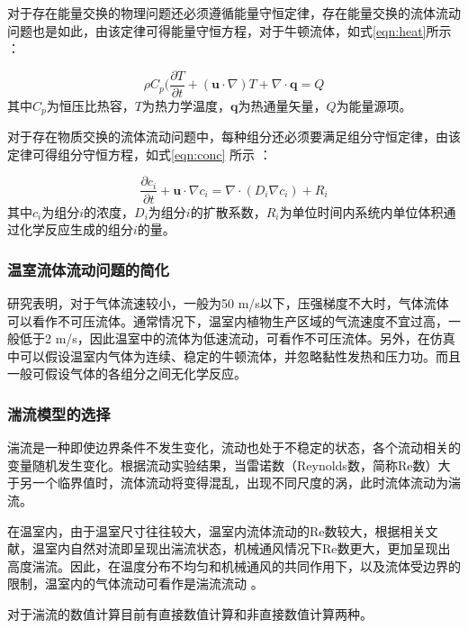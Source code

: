 对于存在能量交换的物理问题还必须遵循能量守恒定律，存在能量交换的流体流动问题也是如此，由该定律可得能量守恒方程，对于牛顿流体，如式\ref{eqn:heat}所示\supercite{ComsolHeat2015,WangFujun2004} ：

	\begin{equation}
		\label{eqn:heat}
		\rho C_p (\frac{\partial T}{\partial t}+(\mathbf{u} \cdot \nabla) T + \nabla \cdot \mathbf{q}  =Q
	\end{equation}
其中$C_p$为恒压比热容，$T$为热力学温度，$\mathbf{q}$为热通量矢量，$Q$为能量源项。

对于存在物质交换的流体流动问题中，每种组分还必须要满足组分守恒定律，由该定律可得组分守恒方程，如式\ref{eqn:conc} 所示\supercite{ComsolChem2015,WangFujun2004} ：

	\begin{equation}
		\label{eqn:conc}
		\frac{\partial c_i}{\partial t}+\mathbf{u} \cdot \nabla c_i = \nabla \cdot (D_i \nabla c_i ) + R_i
	\end{equation}
其中$c_i$为组分$i$的浓度，$D_i$为组分$i$的扩散系数，$R_i$为单位时间内系统内单位体积通过化学反应生成的组分$i$的量。

		\subsubsection{温室流体流动问题的简化}
研究表明，对于气体流速较小，一般为50 m/s以下，压强梯度不大时，气体流体可以看作不可压流体。通常情况下，温室内植物生产区域的气流速度不宜过高，一般低于2 m/s，因此温室中的流体为低速流动，可看作不可压流体。另外，在仿真中可以假设温室内气体为连续、稳定的牛顿流体，并忽略黏性发热和压力功。而且一般可假设气体的各组分之间无化学反应。

		\subsubsection{湍流模型的选择}
湍流是一种即使边界条件不发生变化，流动也处于不稳定的状态，各个流动相关的变量随机发生变化。根据流动实验结果，当雷诺数（Reynolds数，简称Re数）大于另一个临界值时，流体流动将变得混乱，出现不同尺度的涡，此时流体流动为湍流。

在温室内，由于温室尺寸往往较大，温室内流体流动的Re数较大，根据相关文献，温室内自然对流即呈现出湍流状态，机械通风情况下Re数更大，更加呈现出高度湍流。因此，在温度分布不均匀和机械通风的共同作用下，以及流体受边界的限制，温室内的气体流动可看作是湍流流动\supercite{WangFujun2004} 。

对于湍流的数值计算目前有直接数值计算和非直接数值计算两种。

